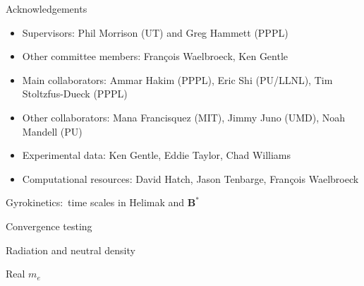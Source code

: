 \documentclass[12pt,table]{beamer}
\begin{document}
\begin{frame}{Acknowledgements}
\begin{block}{}
    \begin{itemize}
        \item Supervisors: Phil Morrison (UT) and Greg Hammett (PPPL)
        \smallskip
        \item Other committee members: Fran\c cois Waelbroeck, Ken Gentle
        \smallskip
        \item Main collaborators: Ammar Hakim (PPPL), Eric Shi (PU/LLNL), Tim Stoltzfus-Dueck (PPPL)
        \smallskip
        \item Other collaborators: Mana Francisquez (MIT), Jimmy Juno (UMD),  Noah Mandell (PU)
        \smallskip
        \item Experimental data: Ken Gentle, Eddie Taylor, Chad Williams
        \smallskip
        \item Computational resources: David Hatch, Jason Tenbarge, Fran\c cois Waelbroeck
    \end{itemize}
    \end{block}
\end{frame}

\appendix
\begin{frame}{Gyrokinetics:~time scales in Helimak and $\bm{B}^*$}
    
\end{frame}

\begin{frame}{Convergence testing}
    
\end{frame}

\begin{frame}{Radiation and neutral density}
    
\end{frame}

\begin{frame}{Real $m_e$}
    
\end{frame}
\end{document}
